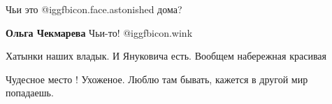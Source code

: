  
 
 
 
 

Чьи это @igg{fbicon.face.astonished}  дома?

\textbf{Ольга Чекмарева} Чьи-то! @igg{fbicon.wink} 

Хатынки наших владык. И Януковича есть. Вообщем набережная красивая

Чудесное место ! Ухоженое.
Люблю там бывать, кажется в другой мир попадаешь.
